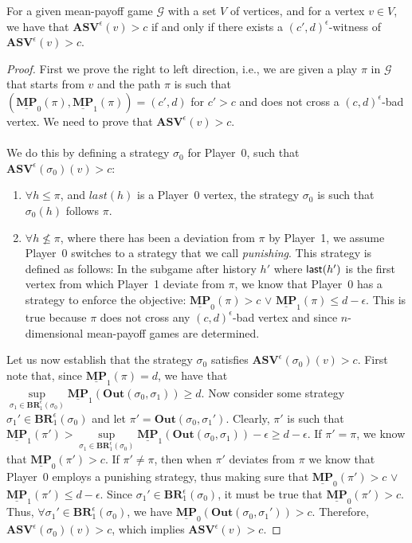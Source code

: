 \begin{theorem}
\label{ThmWitnessASVInfMem}
For a given mean-payoff game $\mathcal{G}$ with a set $V$ of vertices, and for a vertex $v \in V$, we have that $\mathbf{ASV}^{\epsilon}(v) > c$ if and only if there exists a 
$(c',d)^{\epsilon}$-witness of $\mathbf{ASV}^{\epsilon}(v) > c$.
\end{theorem}
\begin{proof}
First we prove the right to left direction, i.e., we are given a play $\pi$ in $\mathcal{G}$ that starts from $v$   and the path $\pi$ is such that $(\underline{\mathbf{MP}}_0(\pi), \underline{\mathbf{MP}}_1(\pi)) = (c', d)$ for $c' > c$ and does not cross a $(c,d)^{\epsilon}$-bad vertex. We need to prove that $\mathbf{ASV}^{\epsilon}(v) > c$.
\\
\\
We do this by defining a strategy $\sigma_0$ for Player~0, such that $\mathbf{ASV}^{\epsilon}(\sigma_0)(v) > c$:
\begin{enumerate}
    \item $\forall h \leqslant \pi$, and $last(h)$ is a Player~0 vertex, the strategy $\sigma_0$ is such that $\sigma_0(h)$ follows $\pi$.
    \item $\forall h \nleqslant \pi$, where there has been a deviation from $\pi$ by Player~1, we assume Player~0 switches to a strategy that we call \textit{punishing}. This strategy is defined as follows: In the subgame after history $h'$ where ${\sf last}(h')$ is the first vertex from which Player~1 deviate from $\pi$, we know that Player~0 has a strategy to enforce the objective: $\underline{\mathbf{MP}}_0(\pi) > c$ $\lor$ $ \underline{\mathbf{MP}}_1(\pi) \leqslant d-\epsilon$. This is true because $\pi$ does not cross any $(c,d)^{\epsilon}$-bad vertex and since $n$-dimensional mean-payoff games are determined.
\end{enumerate}

Let us now establish that the strategy $\sigma_0$ satisfies $\mathbf{ASV}^{\epsilon}(\sigma_0)(v) > c$. 
First note that, since $\underline{\mathbf{MP}}_1(\pi) = d$, we have that $\sup\limits_{\sigma_1 \in \mathbf{BR}_1^{\epsilon}(\sigma_0)} \underline{\mathbf{MP}}_1(\mathbf{Out}(\sigma_0, \sigma_1)) \geqslant d$. Now consider some strategy $\sigma_1' \in \mathbf{BR}_1^{\epsilon}(\sigma_0)$ and let $\pi' = \mathbf{Out}(\sigma_0, \sigma_1')$. Clearly, $\pi'$ is such that $\underline{\mathbf{MP}}_1(\pi') > \sup\limits_{\sigma_1 \in \mathbf{BR}_1^{\epsilon}(\sigma_0)} \underline{\mathbf{MP}}_1(\mathbf{Out}(\sigma_0, \sigma_1)) -\epsilon \geqslant d-\epsilon$. If $\pi' = \pi$, we know that $\underline{\mathbf{MP}}_0(\pi') > c$. If $\pi' \neq \pi$, then when $\pi'$ deviates from $\pi$ we know that Player~0 employs a punishing strategy, thus making sure that $\underline{\mathbf{MP}}_0(\pi') > c$ $\lor$ $ \underline{\mathbf{MP}}_1(\pi') \leqslant d-\epsilon$. Since $\sigma_1' \in \mathbf{BR}_1^{\epsilon}(\sigma_0)$, it must be true that $\underline{\mathbf{MP}}_0(\pi') > c$. Thus, $\forall \sigma_1' \in \mathbf{BR}_1^{\epsilon}(\sigma_0)$, we have $\underline{\mathbf{MP}}_0(\mathbf{Out}(\sigma_0, \sigma_1')) > c$. Therefore, $\mathbf{ASV}^{\epsilon}(\sigma_0)(v) > c$, which implies $\mathbf{ASV}^{\epsilon}(v) > c$.


\end{proof}
